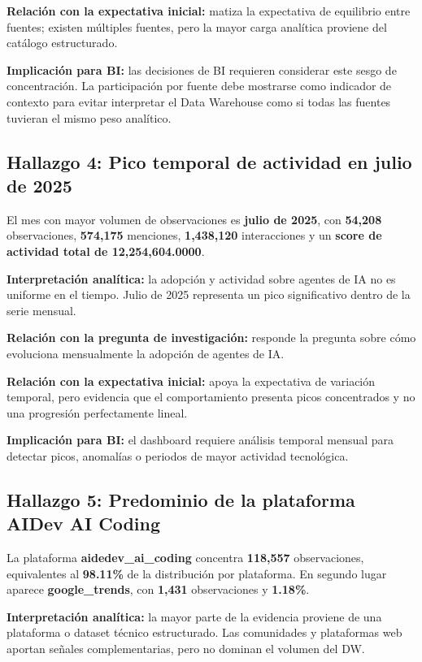 \documentclass[12pt,a4paper]{article}
\begin{document}
\textbf{Relaci\'on con la expectativa inicial:} matiza la expectativa de equilibrio entre fuentes; existen m\'ultiples fuentes, pero la mayor carga anal\'itica proviene del cat\'alogo estructurado.

\textbf{Implicaci\'on para BI:} las decisiones de BI requieren considerar este sesgo de concentraci\'on. La participaci\'on por fuente debe mostrarse como indicador de contexto para evitar interpretar el Data Warehouse como si todas las fuentes tuvieran el mismo peso anal\'itico.

\subsection*{Hallazgo 4: Pico temporal de actividad en julio de 2025}

El mes con mayor volumen de observaciones es \textbf{julio de 2025}, con \textbf{54,208} observaciones, \textbf{574,175} menciones, \textbf{1,438,120} interacciones y un \textbf{score de actividad total de 12,254,604.0000}.

\textbf{Interpretaci\'on anal\'itica:} la adopci\'on y actividad sobre agentes de IA no es uniforme en el tiempo. Julio de 2025 representa un pico significativo dentro de la serie mensual.

\textbf{Relaci\'on con la pregunta de investigaci\'on:} responde la pregunta sobre c\'omo evoluciona mensualmente la adopci\'on de agentes de IA.

\textbf{Relaci\'on con la expectativa inicial:} apoya la expectativa de variaci\'on temporal, pero evidencia que el comportamiento presenta picos concentrados y no una progresi\'on perfectamente lineal.

\textbf{Implicaci\'on para BI:} el dashboard requiere an\'alisis temporal mensual para detectar picos, anomal\'ias o periodos de mayor actividad tecnol\'ogica.

\subsection*{Hallazgo 5: Predominio de la plataforma AIDev AI Coding}

La plataforma \textbf{aidedev\_ai\_coding} concentra \textbf{118,557} observaciones, equivalentes al \textbf{98.11\%} de la distribuci\'on por plataforma. En segundo lugar aparece \textbf{google\_trends}, con \textbf{1,431} observaciones y \textbf{1.18\%}.

\textbf{Interpretaci\'on anal\'itica:} la mayor parte de la evidencia proviene de una plataforma o dataset t\'ecnico estructurado. Las comunidades y plataformas web aportan se\~nales complementarias, pero no dominan el volumen del DW.
\end{document}
